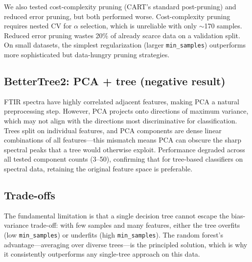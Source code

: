 \documentclass[10pt, a4paper]{article}
\begin{document}
We also tested cost-complexity pruning (CART's standard post-pruning) and reduced error
pruning, but both performed worse. Cost-complexity pruning requires nested CV for
$\alpha$ selection, which is unreliable with only $\sim$170 samples. Reduced error pruning
wastes 20\% of already scarce data on a validation split. On small datasets, the simplest
regularization (larger \texttt{min\_samples}) outperforms more sophisticated but data-hungry
pruning strategies.

\subsection{BetterTree2: PCA + tree (negative result)}

FTIR spectra have highly correlated adjacent features, making PCA a natural
preprocessing step. However, PCA projects onto directions of maximum variance,
which may not align with the directions most discriminative for classification.
Trees split on individual features, and PCA components are dense linear combinations
of all features---this mismatch means PCA can obscure the sharp spectral peaks that
a tree would otherwise exploit. Performance degraded across all tested component
counts (3--50), confirming that for tree-based classifiers on spectral data,
retaining the original feature space is preferable.

\subsection{Trade-offs}

The fundamental limitation is that a single decision tree cannot escape the
bias-variance trade-off: with few samples and many features, either the tree
overfits (low \texttt{min\_samples}) or underfits (high \texttt{min\_samples}).
The random forest's advantage---averaging over diverse trees---is the principled
solution, which is why it consistently outperforms any single-tree approach on this data.
\end{document}
